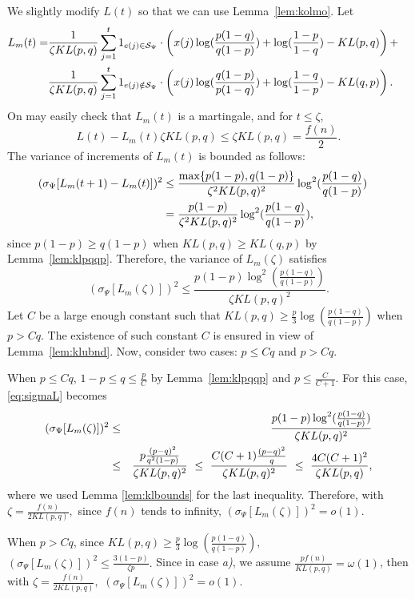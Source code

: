 We slightly modify $L (t)$ so that we can use
Lemma~\ref{lem:kolmo}. Let  
\begin{align*}L_m(t) = & \frac{1}{\zeta KL(p,q)}\sum_{j=1}^t 1_{e(j)  \in \mathcal{S}_{\Psi}} \cdot \left( x(j) \log(\frac{p(1-q)}{q(1-p)}) +
\log(\frac{1-p}{1-q})-KL(p,q) \right)+\cr 
&\frac{1}{\zeta KL(p,q)}\sum_{j=1}^t 1_{e(j)  \notin \mathcal{S}_{\Psi}} \cdot \left(x(j)
\log(\frac{q(1-p)}{p(1-q)}) +
\log(\frac{1-q}{1-p})-KL(q,p)\right).\end{align*} 
On may easily check that $L_m(t)$ is a martingale, and for $t \le \zeta$,
\begin{equation}L(t) - L_m(t) \zeta KL(p,q) \le \zeta KL(p,q) =
  \frac{f(n)}{2}. \label{eq:llmd}\end{equation}
The variance of increments of $L_m(t)$ is bounded as follows:
\begin{align*}(\sigma_{\Psi}[L_m(t+1)-L_m (t)])^2 &\le \frac{\max\{p(1-p),q(1-p)\}}{\zeta^2KL(p,q)^2}\log^2(\frac{p(1-q)}{q(1-p)})\cr
&=\frac{p(1-p)}{\zeta^2KL(p,q)^2}\log^2(\frac{p(1-q)}{q(1-p)}),\end{align*}
since $p(1-p) \ge
q(1-p)$ when $KL(p,q) \ge KL(q,p)$ by
Lemma~\ref{lem:klpqqp}. Therefore, the variance of $L_m(\zeta)$ satisfies
\begin{equation}(\sigma_{\Psi}[L_m (\zeta) ])^2 \le \frac{ p(1-p)
    \log^2(\frac{p(1-q)}{q(1-p)})}{\zeta KL(p,q)^2}
  . \label{eq:sigmaL} \end{equation} 
Let $C$ be a large enough constant such that $KL(p,q) \ge
\frac{p}{3}\log(\frac{p(1-q)}{q(1-p)})$ when $p >Cq$. The existence of such constant $C$ is ensured in view of Lemma~\ref{lem:klubnd}.  Now,
consider two cases: $p \le Cq$ and $p > Cq$.

When $p \le Cq$, $1-p \le q \le \frac{p}{C}$  by
Lemma~\ref{lem:klpqqp} and $p \le \frac{C}{C+1}$. For this case,
\eqref{eq:sigmaL} becomes
\begin{eqnarray*} 
(\sigma_{\Psi}[L_m (\zeta) ])^2 & \le& \frac{ p(1-p)
    \log^2(\frac{p(1-q)}{q(1-p)})}{\zeta KL(p,q)^2} \cr
&\le &\frac{p \frac{(p-q)^2}{q^2(1-p)} }{\zeta KL(p,q)^2} ~\le~\frac{C(C+1)\frac{(p-q)^2}{q} }{\zeta KL(p,q)^2} ~\le~  \frac{4C(C+1)^2}{\zeta  KL(p,q)},
\end{eqnarray*}
where we used Lemma \ref{lem:klbounds} for the last
inequality. Therefore, with $\zeta = \frac{f(n)}{2 KL(p,q)},$
since $f(n)$ tends to infinity, $ (\sigma_{\Psi}[L_m
(\zeta) ])^2 = o(1)$. 


When $p > Cq$, since $KL(p,q) \ge \frac{p}{3}\log\left(\frac{p(1-q)}{q(1-p)}\right),$
$(\sigma_{\Psi}[L_m (\zeta) ])^2 \le
\frac{3(1-p)}{\zeta p} .$
Since in case {\em a)}, we assume $\frac{ pf(n)}{KL(p,q) }  =
\omega( 1 )$, then with $\zeta = \frac{f(n)}{2 KL(p,q)},$
$(\sigma_{\Psi}[L_m (\zeta) ])^2 = o(1).$

